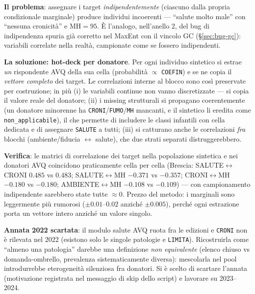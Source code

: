 \documentclass[11pt,a4paper]{article}
\newcommand{\code}[1]{\texttt{#1}}
\begin{document}
\medskip\noindent\textbf{Il problema}: assegnare i target
\emph{indipendentemente} (ciascuno dalla propria condizionale marginale)
produce individui incoerenti --- ``salute molto male'' con ``nessuna
cronicit\`a'' e MH$=95$. \`E l'analogo, nell'anello 2, del bug di
indipendenza spuria gi\`a corretto nel MaxEnt con il vincolo GC
(\S\ref{sec:bug-gc}): variabili correlate nella realt\`a, campionate come
se fossero indipendenti.

\medskip\noindent\textbf{La soluzione: hot-deck per donatore}. Per ogni
individuo sintetico si estrae \emph{un} rispondente AVQ della sua cella
(probabilit\`a $\propto$ \code{COEFIN}) e se ne copia il \emph{vettore
completo} dei target. Le correlazioni interne al blocco sono cos\`i
preservate per costruzione; in pi\`u (i) le variabili continue non vanno
discretizzate --- si copia il valore reale del donatore; (ii) i missing
strutturali si propagano coerentemente (un donatore minorenne ha
\code{CRONI}/\code{FUMO}/\code{MH} mancanti, e il sintetico li eredita
come \code{non\_applicabile}), il che permette di includere le classi
infantili con cella dedicata e di assegnare \code{SALUTE} a tutti;
(iii) si catturano anche le correlazioni \emph{fra} blocchi
(ambiente/fiducia $\leftrightarrow$ salute), che due strati separati
distruggerebbero.

\medskip\noindent\textbf{Verifica}: le matrici di correlazione dei target
nella popolazione sintetica e nei donatori AVQ coincidono praticamente
cella per cella (Brescia: SALUTE$\leftrightarrow$CRONI $0.485$ vs
$0.483$; SALUTE$\leftrightarrow$MH $-0.371$ vs $-0.357$;
CRONI$\leftrightarrow$MH $-0.180$ vs $-0.180$; AMBIENTE$\leftrightarrow$MH
$-0.108$ vs $-0.109$) --- con campionamento indipendente sarebbero state
tutte $\approx0$. Prezzo del metodo: i marginali sono leggermente pi\`u
rumorosi ($\pm0.01$--$0.02$ anzich\'e $\pm0.005$), perch\'e ogni
estrazione porta un vettore intero anzich\'e un valore singolo.

\medskip\noindent\textbf{Annata 2022 scartata}: il modulo salute AVQ ruota
fra le edizioni e \code{CRONI} non \`e rilevata nel 2022 (esistono solo le
singole patologie e \code{LIMITA}). Ricostruirla come ``almeno una
patologia'' darebbe una definizione \emph{non equivalente} (elenco chiuso
vs domanda-ombrello, prevalenza sistematicamente diversa): mescolarla nel
pool introdurrebbe eterogeneit\`a silenziosa fra donatori. Si \`e scelto di
scartare l'annata (motivazione registrata nel messaggio di skip dello
script) e lavorare su 2023--2024.
\end{document}
